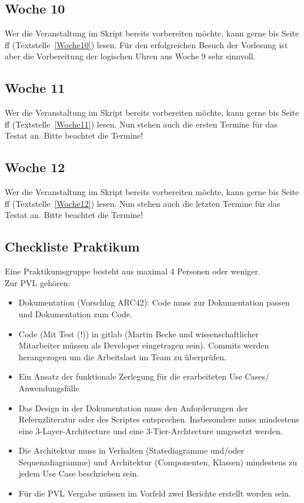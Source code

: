 \subsection{Woche 10}
Wer die Veranstaltung im Skript bereits vorbereiten möchte, kann gerne bis Seite \pageref{Woche10}ff (Textstelle~\ref{Woche10}) lesen. Für den erfolgreichen Besuch der Vorlesung ist aber die Vorbereitung der logischen Uhren aus Woche 9 sehr sinnvoll.

\subsection{Woche 11}
Wer die Veranstaltung im Skript bereits vorbereiten möchte, kann gerne bis Seite \pageref{Woche11}ff (Textstelle~\ref{Woche11}) lesen.
Nun stehen auch die ersten Termine für das Testat an. Bitte beachtet die Termine!

\subsection{Woche 12}
Wer die Veranstaltung  im Skript bereits vorbereiten möchte, kann gerne bis Seite \pageref{Woche12}ff (Textstelle~\ref{Woche12}) lesen.
Nun stehen auch die letzten Termine für das Testat an. Bitte beachtet die Termine!

\subsection{Checkliste Praktikum}

Eine Praktikumsgruppe besteht aus maximal 4 Personen oder weniger.\\
Zur PVL gehören:
\begin{itemize}
    \item Dokumentation (Vorschlag ARC42): Code muss zur Dokumentation passen und Dokumentation zum Code.
    \item Code (Mit Test (!)) in gitlab (Martin Becke und wissenschaftlicher Mitarbeiter müssen als Developer eingetragen sein). Commits werden herangezogen um die Arbeitslast im Team zu überprüfen.
    \item Ein Ansatz der funktionale Zerlegung für die erarbeiteten Use Cases/ Anwendungsfälle
    \item Das Design in der Dokumentation muss den Anforderungen der Refernzliteratur oder des Scriptes entsprechen. Insbesondere muss mindestens eine 3-Layer-Architecture und eine 3-Tier-Archtecture umgesetzt werden.
    \item Die Architektur muss in Verhalten (Statediagramme und/oder Sequenzdiagramme) und Architektur (Componenten, Klassen) mindestens zu jedem Use Case beschrieben sein.
    \item Für die PVL Vergabe müssen im Vorfeld zwei Berichte erstellt worden sein.
\end{itemize}













